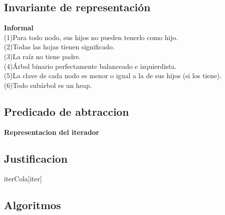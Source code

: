 \begin{Representacion}
\subsection{Invariante de representación}

\textbf{Informal}\\
(1)Para todo nodo, sus hijos no pueden tenerlo como hijo.\\
(2)Todas las hojas tienen significado.\\
(3)La raíz no tiene padre.\\
(4)Árbol binario perfectamente balanceado e izquierdista.\\
(5)La clave de cada nodo es menor o igual a la de sus hijos (si los tiene).\\
(6)Todo subárbol es un heap.\\

\subsection{Predicado de abtraccion}



\bf{Representacion del iterador}

\subsection{Justificacion}

	\begin{Estructura}{iterCola}[iter]
		\begin{Tupla}[iter]
		\end{Tupla}
	\end{Estructura}

\subsection{Algoritmos}


\end{Representacion}

